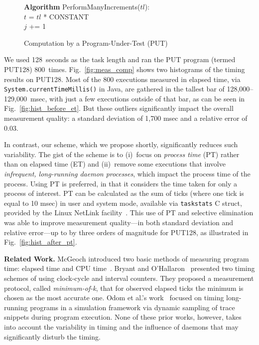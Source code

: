 \documentclass[letter]{ieice}
\begin{document}
\vspace{-.2in}
\begin{figure}[h]
\begin{center}
\begin{algorithmic}
{\bf Algorithm} PerformManyIncrements($tl$): \\
\STATE $t$ = $tl$ * {CONSTANT} \\
		\STATE $j$ += 1 \\
	\ENDFOR 
\ENDFOR 
\end{algorithmic}
\end{center}
\caption{Computation by a Program-Under-Test (PUT)\label{alg:put}}
\vspace{-.2in}
\end{figure}

We used 128~seconds as the task length and ran the PUT program (termed PUT128) 
800~times. Fig.~\ref{fig:meas_comp} shows two histograms of the timing results on PUT128.
Most of the 800 executions measured in elapsed time, 
via  {\tt System.currentTimeMillis()} in Java, are gathered in the tallest bar 
of \hbox{128,000--129,000 msec,} with just a few executions outside of that bar, as can be seen in Fig.~\ref{fig:hist_before_et}. 
But these outliers significantly impact the overall measurement quality: 
a standard deviation of 1,700 msec and a relative error of 0.03. 

In contrast, our scheme, which we propose shortly, 
significantly reduces such variability.
The gist of the scheme is to (i)~focus on
{\em process time} (PT) rather than on elapsed time (ET) and 
(ii)~remove some executions that involve
{\em infrequent, \hbox{long-running} daemon processes}, which impact
the process time of the process. 
Using PT is preferred, in that it considers 
the time taken for only a process of interest.
PT can be calculated as the sum of ticks (where one tick is equal to 10 msec)
in user and system mode, available via {\tt taskstats} C struct, 
provided by the Linux NetLink facility~\cite{Netlink}.
This use of PT and selective elimination 
was able to improve 
measurement quality---in both standard deviation and relative error---up to by 
three orders of magnitude for PUT128, as illustrated in Fig.~\ref{fig:hist_after_pt}. 

{\bf Related Work.} 
McGeoch introduced
two basic methods of measuring program time: elapsed time and CPU time~\cite{Mcgeoch12}. 
Bryant and O'Hallaron~\cite{Randal03} 
presented two timing schemes of using clock-cycle and interval counters. 
They proposed a measurement protocol, called {\em minimum-of-k}, 
that for observed elapsed ticks the minimum is chosen as the most accurate one. 
Odom et al.'s work~\cite{Odom05} focused on timing long-running programs 
in a simulation framework via dynamic sampling of trace snippets during program execution. 
None of these prior works, however, takes into account the variability in 
timing and the influence of daemons that may significantly disturb the timing.
\end{document}
